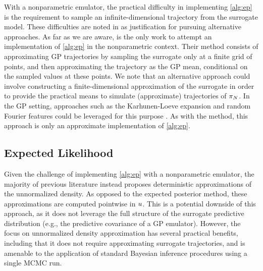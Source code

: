 \documentclass[12pt]{article}
\begin{document}
With a nonparametric emulator, the practical difficulty in 
implementing \cref{alg:ep} is the requirement to sample an infinite-dimensional 
trajectory from the surrogate model.
These difficulties are noted in \citet{VehtariParallelGP} as justification for pursuing alternative 
approaches. As far as we are aware, \citet{trainDynamics} is the only work to attempt an 
implementation of \cref{alg:ep} in the nonparametric context. Their method consists of approximating GP 
trajectories by sampling the surrogate only at a finite grid of points, and then approximating 
the trajectory as the GP mean, conditional on the sampled values at these points.
We note that an alternative approach could involve constructing a finite-dimensional approximation 
of the surrogate in order to provide the practical means to simulate (approximate) trajectories 
of $\postEm[\Ndesign]$. In the GP setting, approaches such as the Karhunen-Loeve expansion 
and random Fourier features could be leveraged for this purpose \citep{dimRedPolyChaos,samplingGPPosts}. 
As with the \citet{trainDynamics} method, this approach is only an approximate implementation of \cref{alg:ep}.

\subsection{Expected Likelihood}
Given the challenge of implementing \cref{alg:ep} with a nonparametric emulator, the majority of 
previous literature instead proposes deterministic approximations of the unnormalized
density. As opposed to the expected posterior method, these approximations are computed 
pointwise in $\Par$. This is a potential downside of this approach, as it does not leverage 
the full structure of the surrogate predictive distribution (e.g., the predictive covariance of a GP emulator).
However, the focus on unnormalized density approximation has several practical benefits, 
including that it does not require approximating surrogate trajectories, and is amenable to the application of 
standard Bayesian inference procedures using a single MCMC run.
\end{document}

